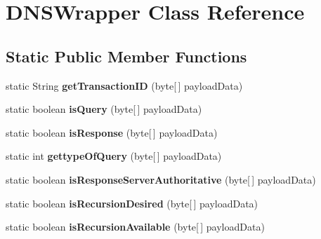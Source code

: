 \hypertarget{class_d_n_s_wrapper}{\section{D\-N\-S\-Wrapper Class Reference}
\label{class_d_n_s_wrapper}
}
\subsection*{Static Public Member Functions}
\begin{DoxyCompactItemize}
\item 
\hypertarget{class_d_n_s_wrapper_a9a2bcbc411742d9e1eacda656352c245}{static String {\bfseries get\-Transaction\-I\-D} (byte\mbox{[}$\,$\mbox{]} payload\-Data)}\label{class_d_n_s_wrapper_a9a2bcbc411742d9e1eacda656352c245}

\item 
\hypertarget{class_d_n_s_wrapper_acd21cbb72789ddcdcef38fb94b0f1b54}{static boolean {\bfseries is\-Query} (byte\mbox{[}$\,$\mbox{]} payload\-Data)}\label{class_d_n_s_wrapper_acd21cbb72789ddcdcef38fb94b0f1b54}

\item 
\hypertarget{class_d_n_s_wrapper_a613bbecce717bd8f65802ce522f3802e}{static boolean {\bfseries is\-Response} (byte\mbox{[}$\,$\mbox{]} payload\-Data)}\label{class_d_n_s_wrapper_a613bbecce717bd8f65802ce522f3802e}

\item 
\hypertarget{class_d_n_s_wrapper_a89fde17bb014c5141734e223e0d0a87d}{static int {\bfseries gettype\-Of\-Query} (byte\mbox{[}$\,$\mbox{]} payload\-Data)}\label{class_d_n_s_wrapper_a89fde17bb014c5141734e223e0d0a87d}

\item 
\hypertarget{class_d_n_s_wrapper_a3d75c910430297f597951f5ec50e9ab5}{static boolean {\bfseries is\-Response\-Server\-Authoritative} (byte\mbox{[}$\,$\mbox{]} payload\-Data)}\label{class_d_n_s_wrapper_a3d75c910430297f597951f5ec50e9ab5}

\item 
\hypertarget{class_d_n_s_wrapper_a4c68aad53bd90045820ae50495739dc0}{static boolean {\bfseries is\-Recursion\-Desired} (byte\mbox{[}$\,$\mbox{]} payload\-Data)}\label{class_d_n_s_wrapper_a4c68aad53bd90045820ae50495739dc0}

\item 
\hypertarget{class_d_n_s_wrapper_a6d6ed8c08360de846793187ee72ab821}{static boolean {\bfseries is\-Recursion\-Available} (byte\mbox{[}$\,$\mbox{]} payload\-Data)}\label{class_d_n_s_wrapper_a6d6ed8c08360de846793187ee72ab821}


\end{DoxyCompactItemize}
